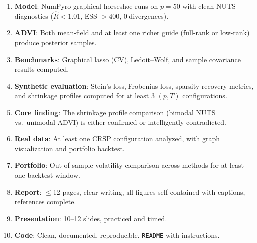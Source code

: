\documentclass[11pt,a4paper]{article}
\begin{document}
\begin{enumerate}
  \item[$\square$] \textbf{Model}: NumPyro graphical horseshoe runs on $p=50$ with clean NUTS diagnostics ($\hat{R} < 1.01$, ESS $> 400$, 0 divergences).
  \item[$\square$] \textbf{ADVI}: Both mean-field and at least one richer guide (full-rank or low-rank) produce posterior samples.
  \item[$\square$] \textbf{Benchmarks}: Graphical lasso (CV), Ledoit--Wolf, and sample covariance results computed.
  \item[$\square$] \textbf{Synthetic evaluation}: Stein's loss, Frobenius loss, sparsity recovery metrics, and shrinkage profiles computed for at least 3 $(p, T)$ configurations.
  \item[$\square$] \textbf{Core finding}: The shrinkage profile comparison (bimodal NUTS vs.\ unimodal ADVI) is either confirmed or intelligently contradicted.
  \item[$\square$] \textbf{Real data}: At least one CRSP configuration analyzed, with graph visualization and portfolio backtest.
  \item[$\square$] \textbf{Portfolio}: Out-of-sample volatility comparison across methods for at least one backtest window.
  \item[$\square$] \textbf{Report}: $\leq$12 pages, clear writing, all figures self-contained with captions, references complete.
  \item[$\square$] \textbf{Presentation}: 10--12 slides, practiced and timed.
  \item[$\square$] \textbf{Code}: Clean, documented, reproducible. \texttt{README} with instructions.
\end{enumerate}
\end{document}
